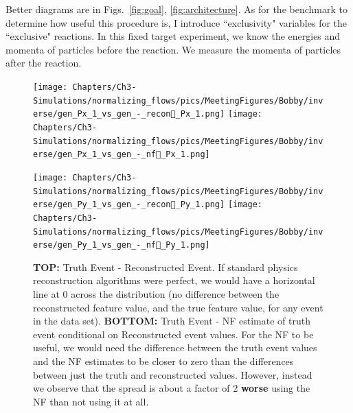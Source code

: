     Better diagrams are in Figs.~\ref{fig:goal}, \ref{fig:architecture}. As for the benchmark to determine how useful this procedure is, I introduce ``exclusivity" variables for the ``exclusive" reactions. In this fixed target experiment, we know the energies and momenta of particles before the reaction. We measure the momenta of particles after the reaction.
    
    
    
    
    
    \begin{figure}[H]
        \centering
        \begin{minipage}{.5\textwidth}
        
            \centering
            
            \texttt{[image: Chapters/Ch3-Simulations/normalizing\_flows/pics/MeetingFigures/Bobby/inverse/gen\_Px\_1\_vs\_gen\_-\_recon\_Px\_1.png]}
            \texttt{[image: Chapters/Ch3-Simulations/normalizing\_flows/pics/MeetingFigures/Bobby/inverse/gen\_Px\_1\_vs\_gen\_-\_nf\_Px\_1.png]}
    
        \end{minipage}%
        \begin{minipage}{.5\textwidth}
        
            \centering
            
            \texttt{[image: Chapters/Ch3-Simulations/normalizing\_flows/pics/MeetingFigures/Bobby/inverse/gen\_Py\_1\_vs\_gen\_-\_recon\_Py\_1.png]}
            \texttt{[image: Chapters/Ch3-Simulations/normalizing\_flows/pics/MeetingFigures/Bobby/inverse/gen\_Py\_1\_vs\_gen\_-\_nf\_Py\_1.png]}
    
        \end{minipage}%
        \caption[Placeholder Short text]{\textbf{TOP:} Truth Event - Reconstructed Event. If standard physics reconstruction algorithms were perfect, we would have a horizontal line at 0 across the distribution (no difference between the reconstructed feature value, and the true feature value, for any event in the data set). \textbf{BOTTOM:} Truth Event - NF estimate of truth event conditional on Reconstructed event values. For the NF to be useful, we would need the difference between the truth event values and the NF estimates to be closer to zero than the differences between just the truth and reconstructed values. However, instead we observe that the spread is about a factor of 2 \textbf{worse} using the NF than not using it at all. }
        \label{fig:16features6}
    \end{figure}
    
